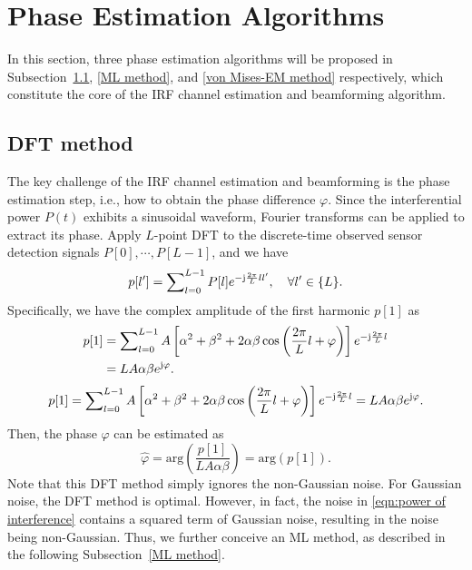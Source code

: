 \documentclass[journal,twocolumn]{IEEEtran}
\theoremstyle{nonumberplain}
\def \arg {\text{arg}}
\begin{document}
    
\section{Phase Estimation Algorithms}
In this section, three phase estimation algorithms will be proposed in Subsection~\ref{DFT method}, \ref{ML method}, and \ref{von Mises-EM method} respectively, which constitute the core of the \ac{IRF} channel estimation and beamforming algorithm.

\subsection{DFT method}  \label{DFT method}
    The key challenge of the IRF channel estimation and beamforming is the phase estimation step, i.e., how to obtain the phase difference $\varphi$. Since the interferential power $P(t)$ exhibits a sinusoidal waveform, Fourier transforms can be applied to extract its phase. Apply $L$-point \ac{DFT} to the discrete-time  observed sensor detection signals $P[0],\cdots ,P[L-1]$, and we have
    \begin{equation}
        \label{DFT}
        p[l']=\sum\nolimits_{l=0}^{L-1}P[l]e^{-{\rm j}\frac{2\pi}{L}ll'},\quad \forall l'\in \{L\}.
    \end{equation}
    Specifically, we have the complex amplitude of the first harmonic $p[1]$ as 
    \ifx\onecol\undefined
        \begin{equation} \label{DFT l=1}
            \begin{aligned}
                p[1]&=\sum\nolimits_{l=0}^{L-1}A\left[\alpha^{2}+\beta^{2}+2\alpha\beta\cos\left(\frac{2\pi}{L}l+\varphi\right)\right]e^{-{\rm j}\frac{2\pi}{L}l}\\
                &=LA\alpha\beta  e^{{\rm j}\varphi}.
            \end{aligned}
        \end{equation}
    \else 
        \begin{equation}
            \label{DFT l=1}
            p[1]=\sum\nolimits_{l=0}^{L-1}A\left[\alpha^{2}+\beta^{2}+2\alpha\beta\cos\left(\frac{2\pi}{L}l+\varphi\right)\right]e^{-{\rm j}\frac{2\pi}{L}l}=LA\alpha\beta  e^{{\rm j}\varphi}.
        \end{equation}
    \fi
    Then, the phase $\varphi$ can be estimated as
    \begin{equation}
        \label{LS estimate result}
        \hat{\varphi}=\arg\left(\frac{p[1]}{LA\alpha\beta}\right) = \arg\left(p[1]\right).
    \end{equation}
    Note that this DFT method simply ignores the non-Gaussian noise. For Gaussian noise, the DFT method is optimal. However, in fact, the noise in \eqref{eqn:power of interference} contains a squared term of Gaussian noise, resulting in the noise being non-Gaussian. Thus, we further conceive an ML method, as described in the following Subsection~\ref{ML method}. 
\end{document}
